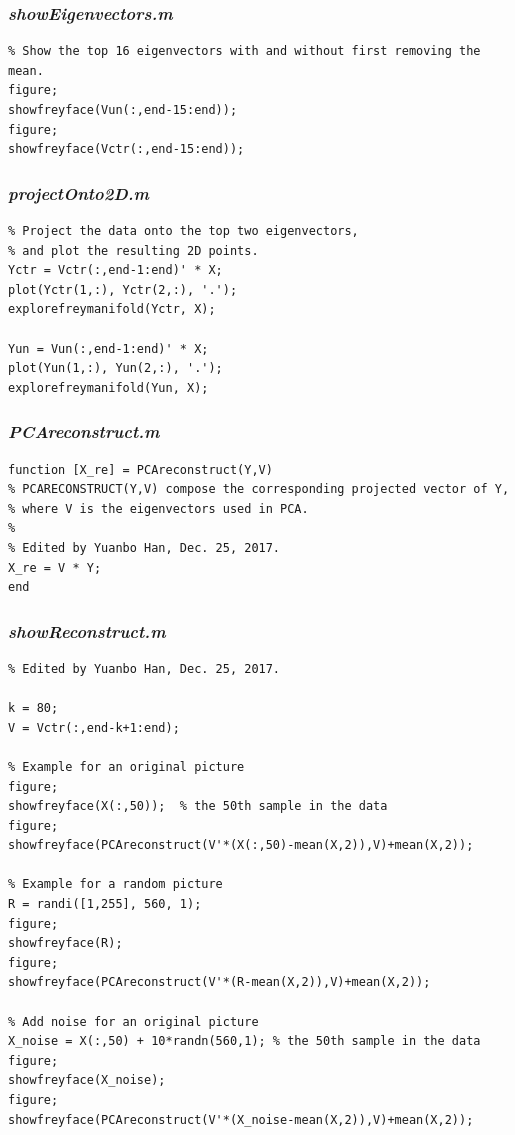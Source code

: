 \documentclass{article}
\begin{document}
\subsubsection{\emph{showEigenvectors.m}}
\begin{lstlisting}
% Show the top 16 eigenvectors with and without first removing the mean.
figure;
showfreyface(Vun(:,end-15:end));
figure;
showfreyface(Vctr(:,end-15:end));

\end{lstlisting}

\subsubsection{\emph{projectOnto2D.m}}
\begin{lstlisting}
% Project the data onto the top two eigenvectors,
% and plot the resulting 2D points.
Yctr = Vctr(:,end-1:end)' * X;
plot(Yctr(1,:), Yctr(2,:), '.');
explorefreymanifold(Yctr, X);

Yun = Vun(:,end-1:end)' * X;
plot(Yun(1,:), Yun(2,:), '.');
explorefreymanifold(Yun, X);

\end{lstlisting}

\subsubsection{\emph{PCAreconstruct.m}}
\begin{lstlisting}
function [X_re] = PCAreconstruct(Y,V)
% PCARECONSTRUCT(Y,V) compose the corresponding projected vector of Y,
% where V is the eigenvectors used in PCA.
%
% Edited by Yuanbo Han, Dec. 25, 2017.
X_re = V * Y;
end

\end{lstlisting}

\subsubsection{\emph{showReconstruct.m}}
\begin{lstlisting}
% Edited by Yuanbo Han, Dec. 25, 2017.

k = 80;
V = Vctr(:,end-k+1:end);

% Example for an original picture
figure;
showfreyface(X(:,50));  % the 50th sample in the data
figure;
showfreyface(PCAreconstruct(V'*(X(:,50)-mean(X,2)),V)+mean(X,2));

% Example for a random picture
R = randi([1,255], 560, 1);
figure;
showfreyface(R);
figure;
showfreyface(PCAreconstruct(V'*(R-mean(X,2)),V)+mean(X,2));

% Add noise for an original picture
X_noise = X(:,50) + 10*randn(560,1); % the 50th sample in the data
figure;
showfreyface(X_noise);
figure;
showfreyface(PCAreconstruct(V'*(X_noise-mean(X,2)),V)+mean(X,2));

\end{lstlisting}
\end{document}
